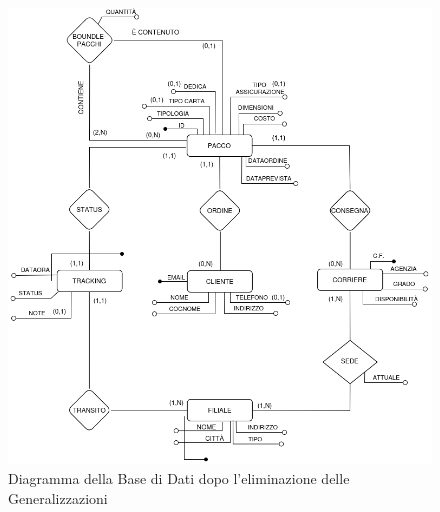 \begin{figure}[H]
\centering
\includegraphics[width=1.0\textwidth]{Resources/ML.png}
\caption{Diagramma della Base di Dati dopo l'eliminazione delle Generalizzazioni}
\label{ML}
\end{figure}
\newpage

